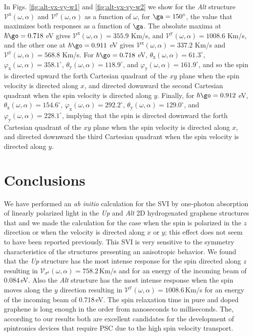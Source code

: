 \documentclass[prb,11pt,tightenlines,twocolumn,aps]{revtex4-1}
\begin{document}
In Figs. \ref{fig:alt-vx-vy-w1} and \ref{fig:alt-vx-vy-w2} we show  for the
\emph{Alt} structure $\mathcal{V}^{\mathrm{x}} (\omega,\alpha)$ and
$\mathcal{V}^{\mathrm{y}} (\omega,\alpha)$ as a function of $\omega$, for
$\ga=150^\circ$, the value that maximizes both responses as a function of
$\ga$.
% 
The absolute maxima at {\color{red} $\hbar\go=0.718$} eV gives
% 
$\mathcal{V}^{\mathrm{x}} (\omega,\alpha) =  355.9$ Km/s, and 
$\mathcal{V}^{\mathrm{y}} (\omega,\alpha) = 1008.6$ Km/s, 
% 
and the other one at {\color{red} $\hbar\go=0.911$} eV gives
% 
$\mathcal{V}^{\mathrm{x}} (\omega,\alpha) = 337.2$ Km/s and
$\mathcal{V}^{\mathrm{y}} (\omega,\alpha) = 568.8$ Km/s.
% 
For $\hbar\go=0.718$ eV,
$\theta_{\mathrm{x}} (\omega,\alpha) = 61.3^{\circ}$, 
$\varphi_{\mathrm{x}}(\omega,\alpha) = 358.1^{\circ}$, 
% 
$\theta_{\mathrm{y}} (\omega,\alpha) = 118.9^{\circ}$, and 
$\varphi_{\mathrm{y}}(\omega,\alpha) = 161.9^{\circ}$, 
% 
and so the spin is directed upward the forth Cartesian quadrant of the
$xy$ plane when the spin velocity is directed along $x$, and directed downward
the second Cartesian quadrant when the spin velocity is directed along $y$.
% 
Finally, for $\hbar\go=0.912$ eV, 
% 
$\theta_{\mathrm{x}} (\omega,\alpha) = 154.6^{\circ}$, 
$\varphi_{\mathrm{x}}(\omega,\alpha) = 292.2^{\circ}$, 
% 
$\theta_{\mathrm{y}} (\omega,\alpha) = 129.0^{\circ}$, and 
$\varphi_{\mathrm{y}}(\omega,\alpha) = 228.1^{\circ}$, 
% 
implying that the spin is directed downward the forth Cartesian quadrant of the
$xy$ plane when the spin velocity is directed along $x$, and directed downward
the third Cartesian quadrant when the spin velocity is directed along $y$.

\section{Conclusions} %
\label{sec:conclusions}

We have performed an \emph{ab initio} calculation for the SVI by one-photon
absorption of linearly polarized light in the \emph{Up} and \emph{Alt} 2D
hydrogenated graphene structures that and we made the calculation for the case
when the spin is polarized in the $z$ direction or when the velocity is
directed along $x$ or $y$; this effect does not seem to have been reported
previously. 
% 
This SVI is very sensitive to the symmetry characteristics of the structures
presenting an anisotropic behavior. We found that the \emph{Up} structure has
the most intense response for the spin directed along $z$ resulting in 
% 
$\mathcal{V}_{\sigma^{\mathrm{z}}} (\omega,\alpha) = 758.2$\,Km/s and 
% 
for an energy of the incoming beam of 0.084\,eV. Also the \emph{Alt} structure
has the most intense response when the spin moves along the $y$ direction
resulting in 
% 
$\mathcal{V}^{\mathrm{y}} (\omega,\alpha) = 1008.6$\,Km/s
% 
for an energy of the incoming beam of 0.718\,eV.
% 
The spin relaxation time in pure and doped graphene is long enough in the order
from nanoseconds to milliseconds. \cite{wojtaszekPRB13,ertlerPRB09} The,
according to our results both are excellent candidates for the development of
spintronics devices that require PSC due to the high spin velocity transport.
\end{document}
